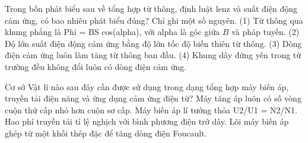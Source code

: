 \begin{ex}
Trong bốn phát biểu sau về tổng hợp từ thông, định luật lenz và suất điện động cảm ứng, có bao nhiêu phát biểu đúng? Chỉ ghi một số nguyên. (1) Từ thông qua khung phẳng là Phi = BS cos(alpha), với alpha là góc giữa $B$ và pháp tuyến. (2) Độ lớn suất điện động cảm ứng bằng độ lớn tốc độ biến thiên từ thông. (3) Dòng điện cảm ứng luôn làm tăng từ thông ban đầu. (4) Khung dây đứng yên trong từ trường đều không đổi luôn có dòng điện cảm ứng.
\end{ex}

\begin{ex}
Cơ sở Vật lí nào sau đây cần được sử dụng trong dạng tổng hợp máy biến áp, truyền tải điện năng và ứng dụng cảm ứng điện từ?
\choice
{Máy tăng áp luôn có số vòng cuộn thứ cấp nhỏ hơn cuộn sơ cấp.}
{\True Máy biến áp lí tưởng thỏa U2/U1 = N2/N1.}
{Hao phí truyền tải tỉ lệ nghịch với bình phương điện trở dây.}
{Lõi máy biến áp ghép từ một khối thép đặc để tăng dòng điện Foucault.}
\end{ex}


